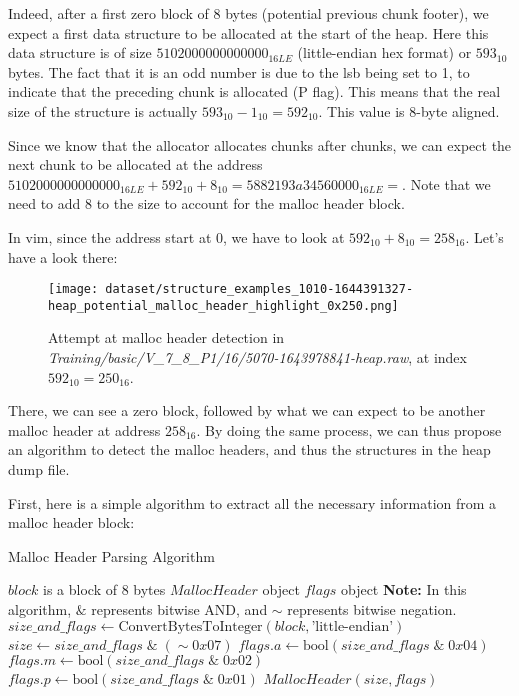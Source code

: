     Indeed, after a first zero block of 8 bytes (potential previous chunk footer), we expect a first data structure to be allocated at the start of the heap. Here this data structure is of size $ 5102000000000000_{16LE} $ (little-endian hex format) or $ 593_{10} $ bytes. The fact that it is an odd number is due to the \acrshort{lsb} being set to 1, to indicate that the preceding chunk is allocated (P flag). This means that the real size of the structure is actually $ 593_{10} - 1_{10} = 592_{10} $. This value is 8-byte aligned.

    Since we know that the allocator allocates chunks after chunks, we can expect the next chunk to be allocated at the address $ 5102000000000000_{16LE} + 592_{10} + 8_{10} = 5882193a34560000_{16LE} =  $. Note that we need to add 8 to the size to account for the malloc header block.
    
    In vim, since the address start at 0, we have to look at $ 592_{10} + 8_{10} = 258_{16} $. Let's have a look there:

    \begin{figure}[H]
        \centering
        \texttt{[image: dataset/structure\_examples\_1010-1644391327-heap\_potential\_malloc\_header\_highlight\_0x250.png]}
        \caption{Attempt at malloc header detection in \textit{Training/basic/V\_7\_8\_P1/16/5070-1643978841-heap.raw}, at index $ 592_{10} = 250_{16} $.}
    \end{figure}

    There, we can see a zero block, followed by what we can expect to be another malloc header at address $ 258_{16} $. By doing the same process, we can thus propose an algorithm to detect the malloc headers, and thus the structures in the heap dump file.

    First, here is a simple algorithm to extract all the necessary information from a malloc header block:

    \begin{algorithm}[H]
        \caption{Malloc Header Parsing Algorithm}
        \begin{algorithmic}[1]
            \Require $block$ is a block of 8 bytes
            \Ensure $MallocHeader$ object
            \Ensure $flags$ object
            \State \textbf{Note:} In this algorithm, $\&$ represents bitwise AND, and $\sim$ represents bitwise negation.
            \State $size\_and\_flags \leftarrow \text{ConvertBytesToInteger}(block, \text{'little-endian'})$
            \State $size \leftarrow size\_and\_flags \; \& \; (\sim 0x07)$ 
            \State $flags.a \leftarrow \text{bool}(size\_and\_flags \; \& \; 0x04)$
            \State $flags.m \leftarrow \text{bool}(size\_and\_flags \; \& \; 0x02)$
            \State $flags.p \leftarrow \text{bool}(size\_and\_flags \; \& \; 0x01)$
            \State \Return $MallocHeader(size, flags)$
        \EndProcedure
        \end{algorithmic}
    \end{algorithm}

